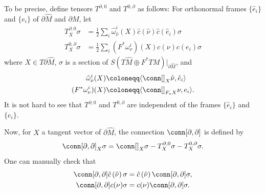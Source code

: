\documentclass[12pt, reqno]{amsart}
\theoremstyle{plain} %
\theoremstyle{definition}
\theoremstyle{remark}
\numberwithin{equation}{section}
\newcommand{\dom}[1]{\hat{#1}}
\newcommand{\bnd}[1]{\partial #1}
\newcommand{\cbar}[1]{\dom{c}\left(#1\right)}
\newcommand{\inner}[1]{\langle #1 \rangle}
\begin{document}
To be precise, define tensors \(T^{\partial,0}\) and \(T^{0,\partial}\) as follows:
For orthonormal frames \(\{\dom{e}_i\}\) and \(\{e_i\}\) of \(\bnd{\dom{M}}\) and \(\bnd{M}\), let
\begin{align*}
    T^{\partial, 0}_X \sigma &= \frac{1}{2} \sum_i \dom{\omega}_{\dom{\nu}}^i(X) \cbar{\dom{\nu}} \cbar{\dom{e}_i} \sigma\\
    T^{0, \partial}_X \sigma &= \frac{1}{2} \sum_i (F^*\omega_{\nu}^i)(X) c(\nu) c(e_i) \sigma
\end{align*}
where \(X \in T\bnd{\dom{M}}\), \(\sigma\) is a section of \(S(T\dom{M} \oplus F^*TM)|_{\bnd{\dom{M}}}\), and
\begin{align*}
    \dom{\omega}_{\dom{\nu}}^i(X) &\coloneqq \inner{\conn[]_X \dom{\nu}, \dom{e}_i} \\
    (F^*\omega_{\nu}^i)(X) &\coloneqq \inner{\conn[]_{F_*X} \nu, e_i}.
\end{align*}
It is not hard to see that \(T^{\partial, 0}\) and \(T^{0, \partial}\) are independent of the frames \(\{\dom{e}_i\}\) and \(\{e_i\}\).

Now, for \(X\) a tangent vector of \(\bnd{\dom{M}}\), the connection \(\conn[\partial, \partial]\) is defined by
\begin{equation*}
    \conn[\partial, \partial]_X \sigma = \conn[]_X \sigma - T^{\partial, 0}_X \sigma - T^{0,\partial}_X \sigma.
\end{equation*}
One can manually check that
\begin{align*}
    \conn[\partial, \partial] \cbar{\dom{\nu}} \sigma &= \cbar{\dom{\nu}} \conn[\partial, \partial] \sigma, \\
    \conn[\partial, \partial] c(\nu) \sigma &= c(\nu) \conn[\partial, \partial] \sigma.
\end{align*}
\end{document}
